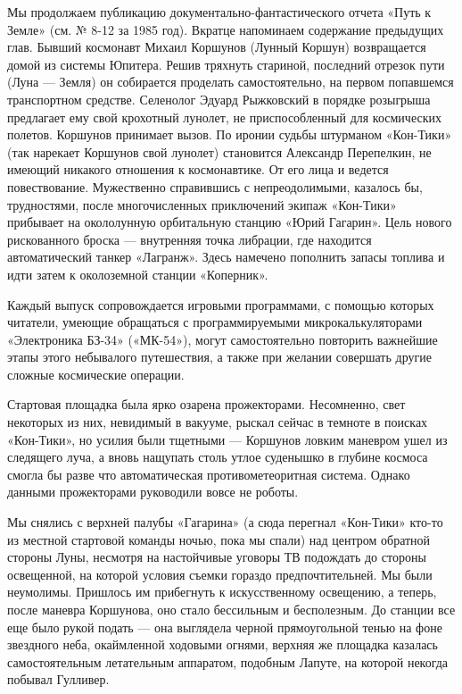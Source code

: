 \documentclass[11pt,a4paper,oneside]{article}
\begin{document}
Мы продолжаем публикацию документально-фантастического отчета «Путь к Земле» (см. № 8-12 за 1985 год). Вкратце напоминаем содержание предыдущих глав. Бывший космонавт Михаил Коршунов (Лунный Коршун) возвращается домой из системы Юпитера. Решив тряхнуть стариной, последний отрезок пути (Луна — Земля) он собирается проделать самостоятельно, на первом попавшемся транспортном средстве. Селенолог Эдуард Рыжковский в порядке розыгрыша предлагает ему свой крохотный лунолет, не приспособленный для космических полетов. Коршунов принимает вызов. По иронии судьбы штурманом «Кон-Тики» (так нарекает Коршунов свой лунолет) становится Александр Перепелкин, не имеющий никакого отношения к космонавтике. От его лица и ведется повествование. Мужественно справившись с непреодолимыми, казалось бы, трудностями, после многочисленных приключений экипаж «Кон-Тики» прибывает на окололунную орбитальную станцию «Юрий Гагарин». Цель нового рискованного броска — внутренняя точка либрации, где находится автоматический танкер «Лагранж». Здесь намечено пополнить запасы топлива и идти затем к околоземной станции «Коперник».

Каждый выпуск сопровождается игровыми программами, с помощью которых читатели, умеющие обращаться с программируемыми микрокалькуляторами «Электроника БЗ-34» («МК-54»), могут самостоятельно повторить важнейшие этапы этого небывалого путешествия, а также при желании совершать другие сложные космические операции.

Стартовая площадка была ярко озарена прожекторами. Несомненно, свет некоторых из них, невидимый в вакууме, рыскал сейчас в темноте в поисках «Кон-Тики», но усилия были тщетными — Коршунов ловким маневром ушел из следящего луча, а вновь нащупать столь утлое суденышко в глубине космоса смогла бы разве что автоматическая противометеоритная система. Однако данными прожекторами руководили вовсе не роботы.

Мы снялись с верхней палубы «Гагарина» (а сюда перегнал «Кон-Тики» кто-то из местной стартовой команды ночью, пока мы спали) над центром обратной стороны Луны, несмотря на настойчивые уговоры ТВ подождать до стороны освещенной, на которой условия съемки гораздо предпочтительней. Мы были неумолимы. Пришлось им прибегнуть к искусственному освещению, а теперь, после маневра Коршунова, оно стало бессильным и бесполезным. До станции все еще было рукой подать — она выглядела черной прямоугольной тенью на фоне звездного неба, окаймленной ходовыми огнями, верхняя же площадка казалась самостоятельным летательным аппаратом, подобным Лапуте, на которой некогда побывал Гулливер.
\end{document}
